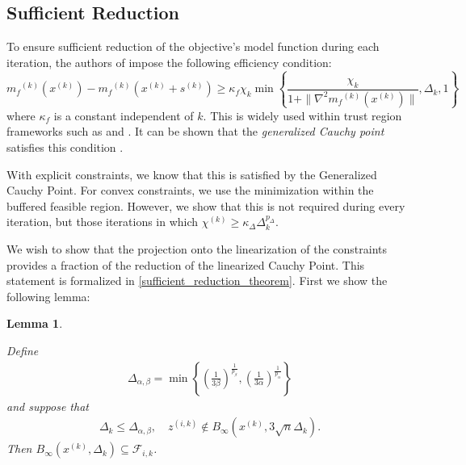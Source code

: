 \documentclass{article}
\newtheorem{lemma}[theorem]{Lemma}
\theoremstyle{case}
\newcommand{\xk}{{x^{(k)}}}
\newcommand{\dk}{\Delta_k}
\newcommand{\mfk}{{{m}_f}^{(k)}}
\newcommand{\sk}{{{s}^{(k)}}}
\newcommand{\chik}{{\chi^{(k)}}}
\newcommand{\zik}{{z^{(i, k)}}}
\newcommand{\fik}{{\mathcal F_{i, k}}}
\newcommand{\tr}{{ B_{\infty}\left(\xk, \dk\right) }}
\newcommand{\deltalargzik}{{\Delta_{\alpha,\beta}}}
\begin{document}
\subsection{Sufficient Reduction}
\label{sufficient_reduction_section}

To ensure sufficient reduction of the objective's model function during each iteration, the authors of \cite{Conejo:2013:GCT:2620806.2621814} impose the following efficiency condition:
\begin{equation}
\label{efficiency}
\mfk(\xk) - \mfk(\xk + \sk) \ge \kappa_f \chi_k \min\left\{ \frac{\chi_k}{1+\|\nabla^2 \mfk(\xk)\|}, \dk, 1 \right\}
\end{equation}
where $\kappa_f$ is a constant independent of $k$.
This is widely used within trust region frameworks such as \cite{Conejo:2013:GCT:2620806.2621814} and \cite{Conn:2000:TM:357813}.
It can be shown that the \emph{generalized Cauchy point} satisfies this condition \cite{Conn:2000:TM:357813}.



With explicit constraints, we know that this is satisfied by the Generalized Cauchy Point.
For convex constraints, we use the minimization within the buffered feasible region.
However, we show that this is not required during every iteration, but those iterations in which $\chik \ge \kappa_{\Delta}\dk^{p_{\Delta}}$.


We wish to show that the projection onto the linearization of the constraints provides a fraction of the reduction of the linearized Cauchy Point.
This statement is formalized in \cref{sufficient_reduction_theorem}.
First we show the following lemma:

\begin{lemma}
\label{large_zik_means_means_no_intersection}

Define
\begin{align}
\deltalargzik = \min\left\{
\left(\frac 1 {3\beta }\right)^{\frac 1 {p_{\beta }}},
\left(\frac 1 {3\alpha}\right)^{\frac 1 {p_{\alpha}}}
\right\} \label{define_deltalargzik}
\end{align}
and suppose that
\begin{align*}
\dk \le \deltalargzik, \quad \zik \not \in B_{\infty}(\xk, 3\sqrt{n}\dk).
\end{align*}
Then $\tr \subseteq \fik$.
\end{lemma}
\end{document}
